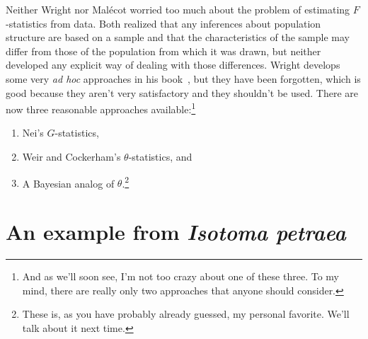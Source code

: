 Neither Wright nor Mal{\'e}cot worried too much about the problem of
estimating $F$-statistics from data. Both realized that any inferences
about population structure are based on a sample and that the
characteristics of the sample may differ from those of the population
from which it was drawn, but neither developed any explicit way of
dealing with those differences. Wright develops some very {\it ad
  hoc\/} approaches in his book~\cite{Wright69}, but they have been
forgotten, which is good because they aren't very satisfactory and
they shouldn't be used. There are now three reasonable approaches
available:\footnote{And as we'll
  soon see, I'm not too crazy about one of these three. To my mind,
  there are really only two approaches that anyone should consider.}

\begin{enumerate}

\item Nei's $G$-statistics,

\item Weir and Cockerham's $\theta$-statistics, and

\item A Bayesian analog of $\theta$.\footnote{These is, as you have
  probably already guessed, my personal favorite. We'll talk about
  it next time.}

\end{enumerate}

\section*{An example from {\it Isotoma petraea}}

